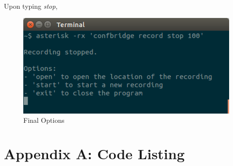 \documentclass[a4paper,11pt]{report}
\begin{document}
Upon typing \textit{stop}, 
\begin{figure}[h]
  \begin{center}
    \includegraphics[scale = 0.5]{stop}
    \caption{Final Options}
  \end{center}
\end{figure}

\newpage
\section*{Appendix A: Code Listing}

\lstset{escapechar=@,style=customc}

\end{document}
